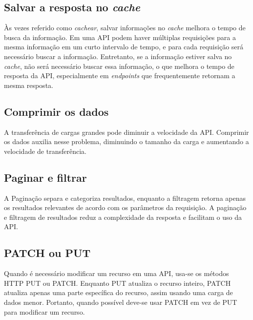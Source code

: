 \subsection{Salvar a resposta no \emph{cache}}
Às vezes referido como \emph{cachear}, salvar informações no \emph{cache} melhora o tempo de busca da informação. Em uma API podem haver múltiplas requisições para a mesma informação em um curto intervalo de tempo, e para cada requisição será necessário buscar a informação. Entretanto, se a informação estiver salva no \emph{cache}, não será necessário buscar essa informação, o que melhora o tempo de resposta da API, especialmente em \emph{endpoints} que frequentemente retornam a mesma resposta. \cite{rapidAPI-twitter}

\subsection{Comprimir os dados}
A transferência de cargas grandes pode diminuir a velocidade da API. Comprimir os dados auxilia nesse problema, diminuindo o tamanho da carga e aumentando a velocidade de transferência. \cite{rapidAPI-twitter}



\subsection{Paginar e filtrar}
A Paginação separa e categoriza resultados, enquanto a filtragem retorna apenas os resultados relevantes de acordo com os parâmetros da requisição. A paginação e filtragem de resultados reduz a complexidade da resposta e facilitam o uso da API. \cite{rapidAPI-twitter}

\subsection{PATCH ou PUT}
Quando é necessário modificar um recurso em uma API, usa-se os métodos HTTP PUT ou PATCH. Enquanto PUT atualiza o recurso inteiro, PATCH atualiza apenas uma parte específica do recurso, assim usando uma carga de dados menor. Portanto, quando possível deve-se usar PATCH em vez de PUT para modificar um recurso. \cite{rapidAPI-twitter}

